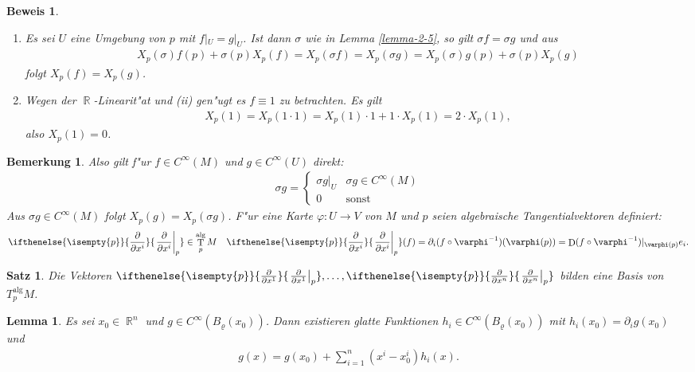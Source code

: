 \documentclass[paper=A4, twoside, chapterprefix=true, bibliography=totoc, headsepline]{scrbook}
\let\temp\phi{}
\let\phi\varphi{}
\let\varphi\temp{}
\let\temp\theta{}
\let\theta\vartheta{}
\let\vartheta\temp{}
\let\temp\epsilon{}
\let\epsilon\varepsilon{}
\let\varepsilon\temp{}
\let\temp\rho{}
\let\rho\varrho{}
\let\varrho\temp{}
\DeclareMathOperator{\R}{\mathbb{R}}
\DeclareMathOperator{\D}{D}         %
\DeclareMathOperator{\T}{T}         %
\newcommand{\pdifffrac}[3][]{\ifthenelse{\isempty{#1}}{\frac{\partial #2}{\partial #3}}{\left. \frac{\partial #2}{\partial #3} \right|_{#1}}}
\theoremstyle{plain}
\newtheorem{Satz}[Dfn]{Satz}
\newtheorem{Lemma}[Dfn]{Lemma}
\theoremstyle{nonumberplain}
\newtheorem{bem}{Bemerkung}
\newtheorem{bew}{Beweis}
\theoremstyle{empty}
\theoremstyle{break}
\begin{document}
\begin{bew}\begin{enumerate}[label=(\roman*),widest=ii,leftmargin=*]
\item[(ii)]
	Es sei $U$ eine Umgebung von $p$ mit $f|_U = g|_U$. Ist dann $\sigma$ wie in Lemma \ref{lemma-2-5}, so gilt $\sigma f = \sigma g$ und aus
	\begin{align*}
		X_p(\sigma)f(p)+\sigma(p)X_p(f) = X_{p}(\sigma f) = X_p(\sigma g) = X_p(\sigma) g(p) + \sigma(p) X_p(g)
	\end{align*}
	folgt $X_p(f) = X_p(g)$.\\
\item[(i)]
	Wegen der $\R$-Linearit"at und (ii) gen"ugt es $f \equiv 1$ zu betrachten. Es gilt
	\begin{align*}
		X_p(1) = X_p(1 \cdot 1) = X_p(1) \cdot 1 + 1 \cdot X_p(1) = 2 \cdot X_p(1),
	\end{align*}
	also $X_p(1) = 0$.
\end{enumerate}\end{bew}

\begin{bem}
  Also gilt f"ur $f \in C^{\infty}(M)$ und $g \in C^{\infty}(U)$ direkt:
  \begin{align*}
    \sigma g =
    \begin{cases}
      \sigma g|_U & \sigma g \in C^{\infty}(M)\\
      0 & \text{sonst}
    \end{cases}
  \end{align*}
  Aus $\sigma g \in C^{\infty}(M)$ folgt $X_p(g) = X_p(\sigma g)$.
  F"ur eine Karte $\phi \colon U \to V$ von $M$ und $p$ seien algebraische Tangentialvektoren definiert:
  \begin{align*}
    \pdifffrac[p]{}{x^i} \in \T_p^{\text{alg}}M && \pdifffrac[p]{}{x^i}(f) = \partial_i(f \circ \phi^{-1})(\phi(p)) = \D(f \circ \phi^{-1})|_{\phi(p)}e_i.
  \end{align*}
\end{bem}

\begin{Satz}\label{satz-2-7}
  Die Vektoren $\pdifffrac[p]{}{x^1},\ldots,\pdifffrac[p]{}{x^n}$ bilden eine Basis von $T_p^{\text{alg}}M$.
\end{Satz}

\begin{Lemma}
  Es sei $x_0 \in \R^n$ und $g \in C^{\infty}(B_{\rho}(x_0))$.
  Dann existieren glatte Funktionen $h_i \in C^{\infty}(B_{\rho}(x_0))$ mit $h_i(x_0) = \partial_ig(x_0)$ und 
  \begin{align*}
    g(x) = g(x_0) + \sum_{i=1}^n(x^i-x_0^i)h_i(x).
  \end{align*}
\end{Lemma}
\end{document}
